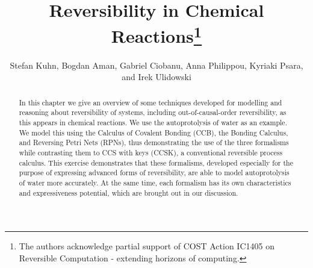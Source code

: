 \documentclass[runningheads]{llncs}
\begin{document}
%
\title{Reversibility in Chemical Reactions\thanks{The authors acknowledge partial support of COST Action IC1405 on Reversible Computation - extending horizons of computing.}}
%
%
\author{Stefan Kuhn, Bogdan Aman, Gabriel Ciobanu,  Anna Philippou, Kyriaki Psara, and  Irek Ulidowski}
%
%
%
\maketitle              %
%
\begin{abstract}
In this chapter we give an overview of some techniques developed for modelling and reasoning about reversibility of systems, including out-of-causal-order reversibility, as this appears in chemical reactions. We use the autoprotolysis of water as an example. We model this using the Calculus of Covalent Bonding (CCB), the Bonding Calculus, and Reversing Petri Nets (RPNs), thus demonstrating the use of the three formalisms while contrasting them to CCS with keys (CCSK), a conventional reversible process calculus. This exercise demonstrates that these formalisms, developed  especially for the purpose of expressing advanced forms of reversibility, are able to model autoprotolysis of water more accurately. At the same time, each formalism has its own characteristics and expressiveness potential, which are brought out in our discussion.

\end{abstract}
%
%
%
\end{document}
